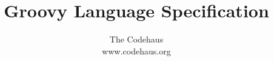 \documentclass[10pt,letterpaper]{book}
\begin{document}
\let\footnoterule\hrule

\makeatletter
\renewcommand{\@makefntext}[1]%
	{\noindent\makebox[1.8em][r]{\@makefnmark}#1}
\makeatother

\title{
	Groovy Language Specification
}

\author{
	\textsf{The Codehaus}\\
	\textsf{www.codehaus.org}\\
}


\frontmatter

\maketitle

\tableofcontents

\listoffigures 



\mainmatter







\appendix




\backmatter



\small
\printindex
\end{document}
